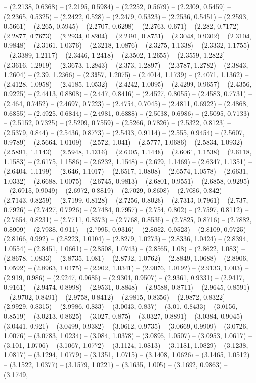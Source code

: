 -- (2.2138, 0.6368) -- (2.2195, 0.5984) -- (2.2252, 0.5679) -- (2.2309, 0.5459) -- (2.2365, 0.5325) -- (2.2422, 0.528) -- (2.2479, 0.5323) -- (2.2536, 0.5451) -- (2.2593, 0.5661) -- (2.265, 0.5945) -- (2.2707, 0.6298) -- (2.2763, 0.671) -- (2.282, 0.7172) -- (2.2877, 0.7673) -- (2.2934, 0.8204) -- (2.2991, 0.8751) -- (2.3048, 0.9302) -- (2.3104, 0.9848) -- (2.3161, 1.0376) -- (2.3218, 1.0876) -- (2.3275, 1.1338) -- (2.3332, 1.1755) -- (2.3389, 1.2117) -- (2.3446, 1.2418) -- (2.3502, 1.2655) -- (2.3559, 1.2822) -- (2.3616, 1.2919) -- (2.3673, 1.2943) -- (2.373, 1.2897) -- (2.3787, 1.2782) -- (2.3843, 1.2604) -- (2.39, 1.2366) -- (2.3957, 1.2075) -- (2.4014, 1.1739) -- (2.4071, 1.1362) -- (2.4128, 1.0958) -- (2.4185, 1.0532) -- (2.4242, 1.0095) -- (2.4299, 0.9657) -- (2.4356, 0.9225) -- (2.4413, 0.8808) -- (2.447, 0.8416) -- (2.4527, 0.8055) -- (2.4583, 0.7731) -- (2.464, 0.7452) -- (2.4697, 0.7223) -- (2.4754, 0.7045) -- (2.4811, 0.6922) -- (2.4868, 0.6855) -- (2.4925, 0.6844) -- (2.4981, 0.6888) -- (2.5038, 0.6986) -- (2.5095, 0.7133) -- (2.5152, 0.7325) -- (2.5209, 0.7559) -- (2.5266, 0.7826) -- (2.5322, 0.8123) -- (2.5379, 0.844) -- (2.5436, 0.8773) -- (2.5493, 0.9114) -- (2.555, 0.9454) -- (2.5607, 0.9789) -- (2.5664, 1.0109) -- (2.572, 1.041) -- (2.5777, 1.0686) -- (2.5834, 1.0932) -- (2.5891, 1.1143) -- (2.5948, 1.1316) -- (2.6005, 1.1448) -- (2.6061, 1.1538) -- (2.6118, 1.1583) -- (2.6175, 1.1586) -- (2.6232, 1.1548) -- (2.629, 1.1469) -- (2.6347, 1.1351) -- (2.6404, 1.1199) -- (2.646, 1.1017) -- (2.6517, 1.0808) -- (2.6574, 1.0578) -- (2.6631, 1.0332) -- (2.6688, 1.0075) -- (2.6745, 0.9813) -- (2.6801, 0.9551) -- (2.6858, 0.9295) -- (2.6915, 0.9049) -- (2.6972, 0.8819) -- (2.7029, 0.8608) -- (2.7086, 0.842) -- (2.7143, 0.8259) -- (2.7199, 0.8128) -- (2.7256, 0.8028) -- (2.7313, 0.7961) -- (2.737, 0.7926) -- (2.7427, 0.7926) -- (2.7484, 0.7957) -- (2.754, 0.802) -- (2.7597, 0.8112) -- (2.7654, 0.8231) -- (2.7711, 0.8373) -- (2.7768, 0.8535) -- (2.7825, 0.8716) -- (2.7882, 0.8909) -- (2.7938, 0.911) -- (2.7995, 0.9316) -- (2.8052, 0.9523) -- (2.8109, 0.9725) -- (2.8166, 0.992) -- (2.8223, 1.0104) -- (2.8279, 1.0273) -- (2.8336, 1.0424) -- (2.8394, 1.0554) -- (2.8451, 1.0661) -- (2.8508, 1.0743) -- (2.8565, 1.08) -- (2.8622, 1.083) -- (2.8678, 1.0833) -- (2.8735, 1.081) -- (2.8792, 1.0762) -- (2.8849, 1.0688) -- (2.8906, 1.0592) -- (2.8963, 1.0475) -- (2.902, 1.0341) -- (2.9076, 1.0192) -- (2.9133, 1.003) -- (2.919, 0.986) -- (2.9247, 0.9685) -- (2.9304, 0.9507) -- (2.9361, 0.9331) -- (2.9417, 0.9161) -- (2.9474, 0.8998) -- (2.9531, 0.8848) -- (2.9588, 0.8711) -- (2.9645, 0.8591) -- (2.9702, 0.8491) -- (2.9758, 0.8412) -- (2.9815, 0.8356) -- (2.9872, 0.8322) -- (2.9929, 0.8315) -- (2.9986, 0.833) -- (3.0043, 0.837) -- (3.01, 0.8433) -- (3.0156, 0.8519) -- (3.0213, 0.8625) -- (3.027, 0.875) -- (3.0327, 0.8891) -- (3.0384, 0.9045) -- (3.0441, 0.921) -- (3.0499, 0.9382) -- (3.0612, 0.9735) -- (3.0669, 0.9909) -- (3.0726, 1.0076) -- (3.0783, 1.0234) -- (3.084, 1.0378) -- (3.0896, 1.0507) -- (3.0953, 1.0617) -- (3.101, 1.0706) -- (3.1067, 1.0772) -- (3.1124, 1.0813) -- (3.1181, 1.0829) -- (3.1238, 1.0817) -- (3.1294, 1.0779) -- (3.1351, 1.0715) -- (3.1408, 1.0626) -- (3.1465, 1.0512) -- (3.1522, 1.0377) -- (3.1579, 1.0221) -- (3.1635, 1.005) -- (3.1692, 0.9863) -- (3.1749, 